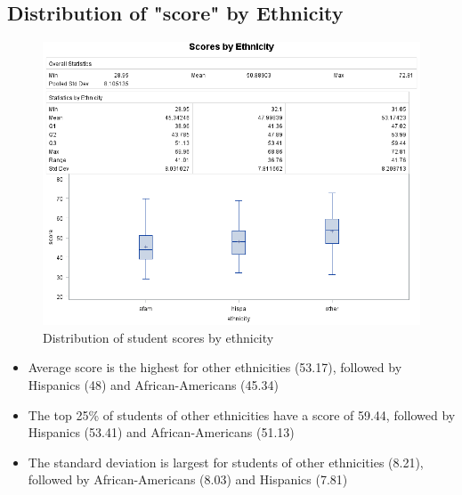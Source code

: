 \documentclass[12pt]{article}
\begin{document}
\subsection{Distribution of "score" by Ethnicity}
\begin{figure}[h]
    \centering
    \includegraphics[width=1.14\textwidth]{images/scores_by_ethnicity.png}
    \caption{Distribution of student scores by ethnicity}
    \label{fig:scores_by_ethnicity}
\end{figure}

\begin{itemize}
    \item Average score is the highest for other ethnicities (53.17), followed by Hispanics (48) and African-Americans (45.34)
    \item The top 25\% of students of other ethnicities have a score of 59.44, followed by Hispanics (53.41) and African-Americans (51.13)
    \item The standard deviation is largest for students of other ethnicities (8.21), followed by African-Americans (8.03) and Hispanics (7.81)
\end{itemize}
\newpage
\end{document}
